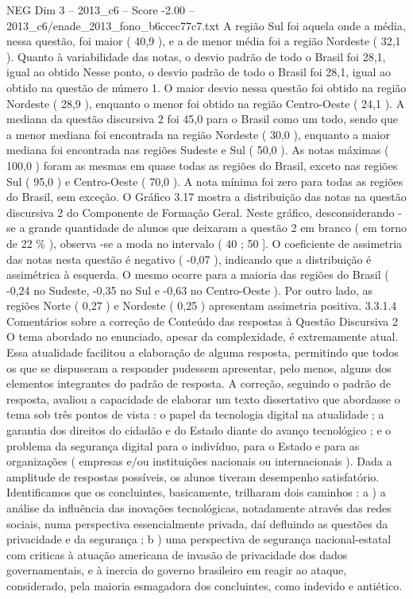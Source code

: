 \begin{textsample}{NEG Dim 3 – 2013\_c6 – Score -2.00 – 2013\_c6/enade\_2013\_fono\_b6ccec77c7.txt}
A região Sul foi aquela onde a média, nessa questão, foi maior ( 40,9 ), e a de menor média foi a região Nordeste ( 32,1 ).
Quanto à variabilidade das notas, o desvio padrão de todo o Brasil foi 28,1, igual ao obtido Nesse ponto, o desvio padrão de todo o Brasil foi 28,1, igual ao obtido na questão de número 1.
O maior desvio nessa questão foi obtido na região Nordeste ( 28,9 ), enquanto o menor foi obtido na região Centro-Oeste ( 24,1 ).
A mediana da questão discursiva 2 foi 45,0 para o Brasil como um todo, sendo que a menor mediana foi encontrada na região Nordeste ( 30,0 ), enquanto a maior mediana foi encontrada nas regiões Sudeste e Sul ( 50,0 ).
As notas máximas ( 100,0 ) foram as mesmas em quase todas as regiões do Brasil, exceto nas regiões Sul ( 95,0 ) e Centro-Oeste ( 70,0 ).
A nota mínima foi zero para todas as regiões do Brasil, sem exceção.
O Gráfico 3.17 mostra a distribuição das notas na questão discursiva 2 do Componente de Formação Geral.
Neste gráfico, desconsiderando -se a grande quantidade de alunos que deixaram a questão 2 em branco ( em torno de 22 \% ), observa -se a moda no intervalo ( 40 ; 50 ].
O coeficiente de assimetria das notas nesta questão é negativo ( -0,07 ), indicando que a distribuição é assimétrica à esquerda.
O mesmo ocorre para a maioria das regiões do Brasil ( -0,24 no Sudeste, -0,35 no Sul e -0,63 no Centro-Oeste ).
Por outro lado, as regiões Norte ( 0,27 ) e Nordeste ( 0,25 ) apresentam assimetria positiva. 3.3.1.4 Comentários sobre a correção de Conteúdo das respostas à Questão Discursiva 2 O tema abordado no enunciado, apesar da complexidade, é extremamente atual.
Essa atualidade facilitou a elaboração de alguma resposta, permitindo que todos os que se dispuseram a responder pudessem apresentar, pelo menos, alguns dos elementos integrantes do padrão de resposta.
A correção, seguindo o padrão de resposta, avaliou a capacidade de elaborar um texto dissertativo que abordasse o tema sob três pontos de vista : o papel da tecnologia digital na atualidade ; a garantia dos direitos do cidadão e do Estado diante do avanço tecnológico ; e o problema da segurança digital para o indivíduo, para o Estado e para as organizações ( empresas e/ou instituições nacionais ou internacionais ).
Dada a amplitude de respostas possíveis, os alunos tiveram desempenho satisfatório.
Identificamos que os concluintes, basicamente, trilharam dois caminhos : a ) a análise da influência das inovações tecnológicas, notadamente através das redes sociais, numa perspectiva essencialmente privada, daí defluindo as questões da privacidade e da segurança ; b ) uma perspectiva de segurança nacional-estatal com criticas à atuação americana de invasão de privacidade dos dados governamentais, e à inercia do governo brasileiro em reagir ao ataque, considerado, pela maioria esmagadora dos concluintes, como indevido e antiético.

\end{textsample}
